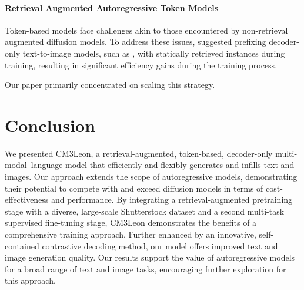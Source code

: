 \documentclass{article}
\newcommand{\mm}{multi-modal}
\begin{document}
\paragraph{Retrieval Augmented Autoregressive Token Models}
Token-based models face challenges akin to those encountered by non-retrieval augmented diffusion models. To address these issues, \citet{RA_CM3} suggested prefixing decoder-only text-to-image models, such as \citet{DALLE, CM3}, with statically retrieved instances during training, resulting in significant efficiency gains during the training process. 

Our paper primarily concentrated on scaling this strategy.

\section{Conclusion}

We presented CM3Leon, a retrieval-augmented, token-based, decoder-only \mm\ language model that efficiently and flexibly generates and infills text and images. Our approach extends the scope of autoregressive models, demonstrating their potential to compete with and exceed diffusion models in terms of cost-effectiveness and performance.
By integrating a retrieval-augmented pretraining stage with a diverse, large-scale Shutterstock dataset and a second multi-task supervised fine-tuning stage, CM3Leon demonstrates the benefits of a comprehensive training approach. Further enhanced by an innovative, self-contained contrastive decoding method, our model offers improved text and image generation quality.
Our results support the value of autoregressive models for a broad range of text and image tasks, encouraging further exploration for this approach. 



\appendix

\end{document}
